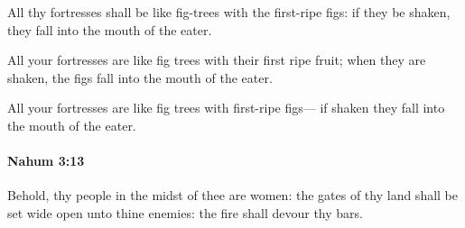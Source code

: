 			\begin{versebox}
					\item[BHS] 
					\item[LXX] 
					\item[ASV] All thy fortresses shall be like fig-trees with the first-ripe figs: if they be shaken, they fall into the mouth of the eater.
					\item[NIV] All your fortresses are like fig trees with their first ripe fruit; when they are shaken, the figs fall into the mouth of the eater.
					\item[NRSV] All your fortresses are like fig trees with first-ripe figs— if shaken they fall into the mouth of the eater.
			\end{versebox}

		\paragraph{Nahum 3:13} %
			\label{NAHUM-3-13}

			Behold, thy people in the midst of thee are women: the gates of thy land shall be set wide open unto thine enemies: the fire shall devour thy bars.

